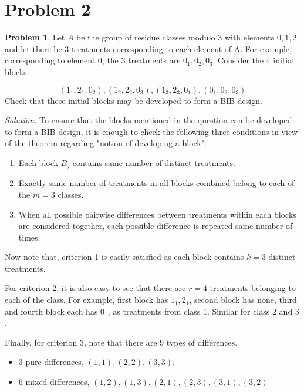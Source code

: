 \documentclass[12pt]{article}
\theoremstyle{definition}
\newtheorem*{prb}{Problem}
\newenvironment{problem}{
\begin{tcolorbox}[colback=blue!5!white,colframe=blue!75!black, parbox = true] \begin{prb}  }{\end{prb}\end{tcolorbox} }
\newenvironment{answer}{\textit{Solution: }\quad }{ \hfill \qedsymbol}
\begin{document}
\section{Problem 2}

\begin{problem}
	Let $A$ be the group of residue classes modulo $3$ with elements $0, 1, 2$ and let there be $3$ treatments corresponding to each element of A. For example, corresponding to element $0$, the $3$ treatments are $0_1, 0_2, 0_3$. Consider the $4$ initial blocks:

	$$(1_1, 2_1, 0_2), (1_2, 2_2, 0_3), (1_3, 2_3, 0_1), (0_1, 0_2, 0_3)$$
Check that these initial blocks may be developed to form a BIB design.
\end{problem}

\begin{answer}
	To ensure that the blocks mentioned in the question can be developed to form a BIB design, it is enough to check the following three conditions in view of the theorem regarding "notion of developing a block".

	\begin{enumerate}
		\item Each block $B_j$ contains same number of distinct treatments.
		\item Exactly same number of treatments in all blocks combined belong to each of the $m = 3$ classes.
		\item When all possible pairwise differences between treatments within each blocks are considered together, each possible difference is repeated same number of times. 
	\end{enumerate}

	Now note that, criterion 1 is easily satisfied as each block contains $k = 3$ distinct treatments.

	For criterion 2, it is also easy to see that there are $r = 4$ treatments belonging to each of the class. For example, first block has $1_1, 2_1$, second block has none, third and fourth block each has $0_1$, as treatments from class $1$. Similar for class $2$ and $3$.
	
	Finally, for criterion 3, note that there are $9$ types of differences.
	
	\begin{itemize}
		\item $3$ pure differences, $(1, 1), (2, 2), (3, 3)$.
		\item $6$ mixed differences, $(1, 2), (1, 3), (2, 1), (2, 3), (3, 1), (3, 2)$
	\end{itemize}


\end{answer}
\end{document}
